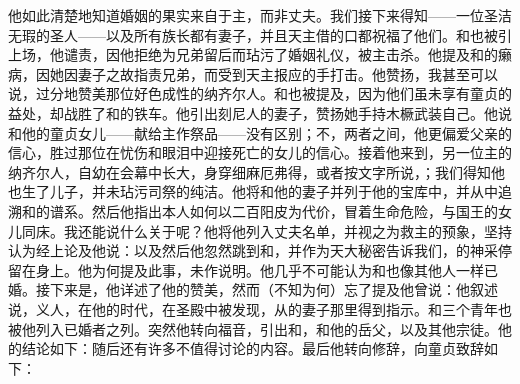 他如此清楚地知道婚姻的果实来自于主，而非丈夫。我们接下来得知——一位圣洁无瑕的圣人——以及所有族长都有妻子，并且天主借的口都祝福了他们。和也被引上场，他谴责，因他拒绝为兄弟留后而玷污了婚姻礼仪，被主击杀。他提及和的癞病，因她因妻子之故指责兄弟，而受到天主报应的手打击。他赞扬，我甚至可以说，过分地赞美那位好色成性的纳齐尔人。和也被提及，因为他们虽未享有童贞的益处，却战胜了和的铁车。他引出刻尼人的妻子，赞扬她手持木橛武装自己。他说和他的童贞女儿——献给主作祭品——没有区别；不，两者之间，他更偏爱父亲的信心，胜过那位在忧伤和眼泪中迎接死亡的女儿的信心。接着他来到，另一位主的纳齐尔人，自幼在会幕中长大，身穿细麻厄弗得，或者按文字所说，；我们得知他也生了儿子，并未玷污司祭的纯洁。他将和他的妻子并列于他的宝库中，并从中追溯和的谱系。然后他指出本人如何以二百阳皮为代价，冒着生命危险，与国王的女儿同床。我还能说什么关于呢？他将他列入丈夫名单，并视之为救主的预象，坚持认为经上论及他说：以及然后他忽然跳到和，并作为天大秘密告诉我们，的神采停留在身上。他为何提及此事，未作说明。他几乎不可能认为和也像其他人一样已婚。接下来是，他详述了他的赞美，然而（不知为何）忘了提及他曾说：他叙述说，义人，在他的时代，在圣殿中被发现，从的妻子那里得到指示。和三个青年也被他列入已婚者之列。突然他转向福音，引出和，和他的岳父，以及其他宗徒。他的结论如下：随后还有许多不值得讨论的内容。最后他转向修辞，向童贞致辞如下：\par

